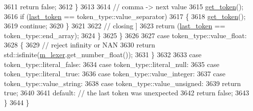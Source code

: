 \begin{DoxyCode}
3611                         \textcolor{keywordflow}{return} \textcolor{keyword}{false};
3612                     \}
3613 
3614                     \textcolor{comment}{// comma -> next value}
3615                     \hyperlink{classnlohmann_1_1detail_1_1parser_a33f3859d0dd402445b5859070fd24bab}{get\_token}();
3616                     \textcolor{keywordflow}{if} (\hyperlink{classnlohmann_1_1detail_1_1parser_a932e49f6f4d291557846744319245994}{last\_token} == token\_type::value\_separator)
3617                     \{
3618                         \hyperlink{classnlohmann_1_1detail_1_1parser_a33f3859d0dd402445b5859070fd24bab}{get\_token}();
3619                         \textcolor{keywordflow}{continue};
3620                     \}
3621 
3622                     \textcolor{comment}{// closing ]}
3623                     \textcolor{keywordflow}{return} (\hyperlink{classnlohmann_1_1detail_1_1parser_a932e49f6f4d291557846744319245994}{last\_token} == token\_type::end\_array);
3624                 \}
3625             \}
3626 
3627             \textcolor{keywordflow}{case} token\_type::value\_float:
3628             \{
3629                 \textcolor{comment}{// reject infinity or NAN}
3630                 \textcolor{keywordflow}{return} std::isfinite(\hyperlink{classnlohmann_1_1detail_1_1parser_a22dcc815551a4052b87797b34171b352}{m\_lexer}.get\_number\_float());
3631             \}
3632 
3633             \textcolor{keywordflow}{case} token\_type::literal\_false:
3634             \textcolor{keywordflow}{case} token\_type::literal\_null:
3635             \textcolor{keywordflow}{case} token\_type::literal\_true:
3636             \textcolor{keywordflow}{case} token\_type::value\_integer:
3637             \textcolor{keywordflow}{case} token\_type::value\_string:
3638             \textcolor{keywordflow}{case} token\_type::value\_unsigned:
3639                 \textcolor{keywordflow}{return} \textcolor{keyword}{true};
3640 
3641             \textcolor{keywordflow}{default}: \textcolor{comment}{// the last token was unexpected}
3642                 \textcolor{keywordflow}{return} \textcolor{keyword}{false};
3643         \}
3644     \}
\end{DoxyCode}
\mbox{\label{classnlohmann_1_1detail_1_1parser_a9abcc7b005c70ee67ce669c398273516}} 
